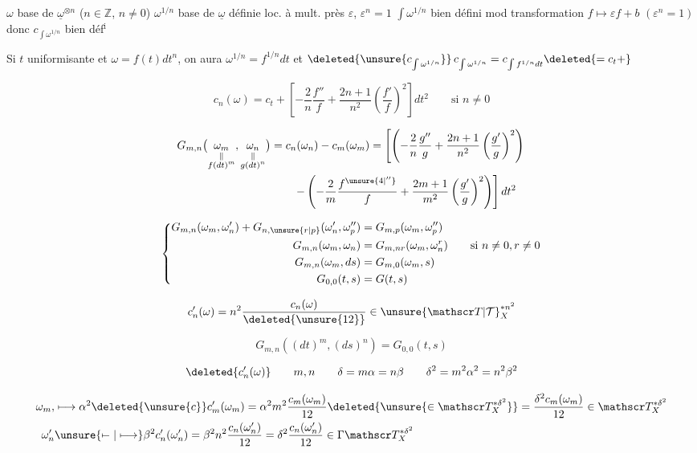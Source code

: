 
$\omega$ base de $\underline\omega^{\otimes n}$ ($n\in\mathbb Z$,  $n\ne0$) $\omega^{1/n}$ base de $\underline\omega$ définie loc. à mult. près $\varepsilon$, $\varepsilon^n=1$ $\int\omega^{1/n}$ bien défini mod transformation $f\longmapsto\varepsilon f+b$ $(\varepsilon^{n}=1)$ donc $c_{\int\omega^{1/n}}$ bien déf$^{\mathrm i}$

Si $t$ uniformisante et $\omega=f(t)dt^n$, on aura $\omega^{1/n}=f^{1/n}dt$ et $\deleted{\unsure{c_{\int\omega^{1/n}}}}\,c_{\int\omega^{1/n}}=c_{\int f^{1/n}dt}\deleted{=c_t+}$

\[ c_n(\omega)=c_t+\left[-\frac2n\frac{f''}{f}+\frac{2n+1}{n^2}\left(\frac{f'}f\right)^2\right]dt^2 \qquad\text{si }n\ne0 \]


\[ \begin{aligned}
 G_{m,n}\bigl(\underset{\substack{\Vert\\ f(dt)^m}}{\omega_m},\underset{\substack{\Vert\\g(dt)^{n}}}{\omega_n}\bigr)
 &=c_n(\omega_n)-c_m(\omega_m)=\left[\left(-\frac2n\frac{g''}g+\frac{2n+1}{n^2}\left(\frac{g'}g\right)^2\right)\right.\\
 &\qquad\left.-\left(-\frac2m\frac{f^{\unsure{4|''}}}{f}+\frac{2m+1}{m^2}\left(\frac{g'}g\right)^2\right)\right]dt^2
 \end{aligned} \]

\[ \left\{\begin{aligned}
 G_{m,n}(\omega_m,\omega'_n)+G_{n,\unsure{r|p}}(\omega'_n,\omega''_p)&=G_{m,p}(\omega_m,\omega''_p)\\
 G_{m,n}(\omega_m,\omega_n)&=G_{m,nr}(\omega_m,\omega_n^r)\qquad\text{si }n\ne0,r\ne0\\
 G_{m,n}(\omega_m,ds)&=G_{m,0}(\omega_m,s)\\
 G_{0,0}(t,s)&=G(t,s)
 \end{aligned}\right. \]


\[ c'_n(\omega)=n^2\frac{c_n(\omega)}{\deleted{\unsure{12}}}\in \unsure{\mathscr T|\mathcal T}_X^{* n^2} \]

\[ G_{m,n}((dt)^m,(ds)^n)=G_{0,0}(t,s) \]

\[ \deleted{c'_n(\omega)}\qquad m,n\qquad\delta=m\alpha=n\beta\qquad\delta^2=m^2\alpha^2=n^2\beta^2 \]

\[ \begin{aligned}
 \omega_m,&\longmapsto\alpha^2\deleted{\unsure{c}}c'_m(\omega_m)=\alpha^2m^2\frac{c_m(\omega_m)}{12}\deleted{\unsure{\in\mathscr T_X^{*\delta^2}}}=\frac{\delta^2c_m(\omega_m)}{12}\in\mathscr T_X^{*\delta^2}\\
 \omega'_n&\unsure{\mapstochar\relbar|\longmapsto}\beta^2c'_n(\omega'_n)=\beta^2n^2\frac{c_n(\omega'_n)}{12}=\delta^2\frac{c_n(\omega'_n)}{12}\in\Gamma\mathscr T_X^{*\delta^2}
 \end{aligned} \]

